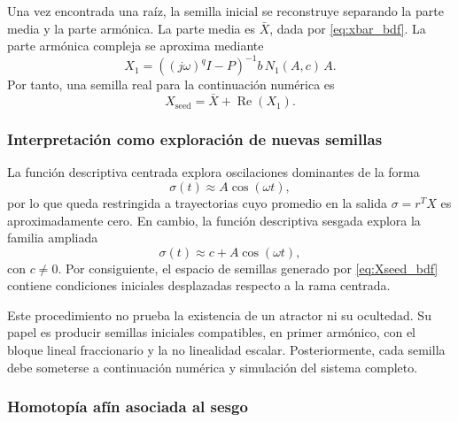 \documentclass[journal]{IEEEtran}
\begin{document}
Una vez encontrada una ra\'{i}z, la semilla inicial se reconstruye separando la
parte media y la parte arm\'{o}nica. La parte media es \(\bar X\), dada por
\eqref{eq:xbar_bdf}. La parte arm\'{o}nica compleja se aproxima mediante
\begin{equation}
X_1
=
\left((j\omega)^q I-P\right)^{-1}
b\,N_1(A,c)\,A.
\label{eq:X1_bdf}
\end{equation}
Por tanto, una semilla real para la continuaci\'{o}n num\'{e}rica es
\begin{equation}
X_{\mathrm{seed}}
=
\bar X+\operatorname{Re}(X_1).
\label{eq:Xseed_bdf}
\end{equation}

\subsubsection{Interpretaci\'{o}n como exploraci\'{o}n de nuevas semillas}

La funci\'{o}n descriptiva centrada explora oscilaciones dominantes de la forma
\[
\sigma(t)\approx A\cos(\omega t),
\]
por lo que queda restringida a trayectorias cuyo promedio en la salida
\(\sigma=r^TX\) es aproximadamente cero. En cambio, la funci\'{o}n descriptiva
sesgada explora la familia ampliada
\[
\sigma(t)\approx c+A\cos(\omega t),
\]
con \(c\neq 0\). Por consiguiente, el espacio de semillas generado por
\eqref{eq:Xseed_bdf} contiene condiciones iniciales desplazadas respecto a la
rama centrada.

Este procedimiento no prueba la existencia de un atractor ni su ocultedad. Su
papel es producir semillas iniciales compatibles, en primer arm\'{o}nico, con el
bloque lineal fraccionario y la no linealidad escalar. Posteriormente, cada
semilla debe someterse a continuaci\'{o}n num\'{e}rica y simulaci\'{o}n del sistema completo.

\subsubsection{Homotop\'{i}a af\'{i}n asociada al sesgo}
\end{document}
